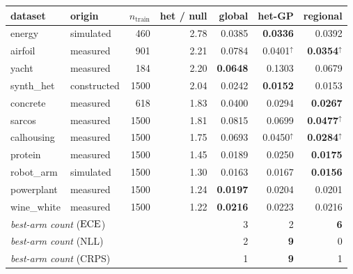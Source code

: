 \begin{tabular}{llrrrrr}
\toprule
dataset & origin & $n_{\text{train}}$ & het / null & global & het-GP & regional \\
\midrule
energy & simulated & 460 & 2.78 & 0.0385 & \textbf{0.0336} & 0.0392 \\
airfoil & measured & 901 & 2.21 & 0.0784 & 0.0401$^{\uparrow}$ & \textbf{0.0354$^{\uparrow}$} \\
yacht & measured & 184 & 2.20 & \textbf{0.0648} & 0.1303 & 0.0679 \\
synth\_het & constructed & 1500 & 2.04 & 0.0242 & \textbf{0.0152} & 0.0153 \\
concrete & measured & 618 & 1.83 & 0.0400 & 0.0294 & \textbf{0.0267} \\
sarcos & measured & 1500 & 1.81 & 0.0815 & 0.0699 & \textbf{0.0477$^{\uparrow}$} \\
calhousing & measured & 1500 & 1.75 & 0.0693 & 0.0450$^{\uparrow}$ & \textbf{0.0284$^{\uparrow}$} \\
protein & measured & 1500 & 1.45 & 0.0189 & 0.0250 & \textbf{0.0175} \\
robot\_arm & simulated & 1500 & 1.30 & 0.0163 & 0.0167 & \textbf{0.0156} \\
powerplant & measured & 1500 & 1.24 & \textbf{0.0197} & 0.0204 & 0.0201 \\
wine\_white & measured & 1500 & 1.22 & \textbf{0.0216} & 0.0223 & 0.0216 \\
\midrule
\multicolumn{4}{l}{\emph{best-arm count} ($\mathrm{ECE}$)} & 3 & 2 & \textbf{6} \\
\multicolumn{4}{l}{\emph{best-arm count} (NLL)} & 2 & \textbf{9} & 0 \\
\multicolumn{4}{l}{\emph{best-arm count} (CRPS)} & 1 & \textbf{9} & 1 \\
\bottomrule
\end{tabular}
